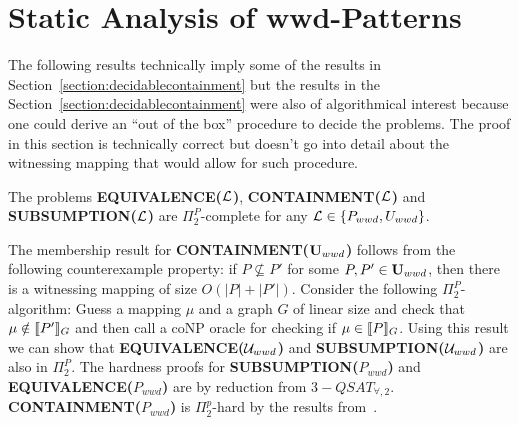 \section{Static Analysis of wwd-Patterns}

The following results technically imply some of the results in
Section~\ref{section:decidablecontainment} but the results in the Section~\ref{section:decidablecontainment}
were also of algorithmical interest because one could derive an ``out of the box''
procedure to decide the problems. The proof in this section is technically
correct but doesn't go into detail about the witnessing mapping that would allow
for such procedure.

\begin{theorem}
	The problems \textbf{EQUIVALENCE($\mathcal{L}$)}, \textbf{CONTAINMENT($\mathcal{L}$)} and
	\textbf{SUBSUMPTION($\mathcal{L}$)} are $\Pi_2^P$-complete 
	for any $\mathcal{L} \in \{ P_{wwd}, U_{wwd} \}$.
\end{theorem}
\begin{proofidea}
	The membership result for \textbf{CONTAINMENT($\mathbf{U}_{wwd}$)} follows from the following
	counterexample property: 
	if $P \not\subseteq P'$ for some $P,P' \in \mathbf{U}_{wwd}$, then
	there is a witnessing mapping of size $O(|P| + |P'|)$.
	Consider the following $\Pi^P_2$-algorithm:
	Guess a mapping $\mu$ and a graph $G$ of linear size and check that $\mu
	\notin \llbracket P' \rrbracket_G$ and then call a coNP oracle for checking if $\mu
	\in \llbracket P \rrbracket_G$.
	Using this result we can show that \textbf{EQUIVALENCE($\mathcal{U}_{wwd}$)}  
	and \textbf{SUBSUMPTION($\mathcal{U}_{wwd}$)} are also in $\Pi^P_2$.
	The hardness proofs for \textbf{SUBSUMPTION($P_{wwd}$)} and\\
	\textbf{EQUIVALENCE($P_{wwd}$)} are by reduction from
	$3-QSAT_{\forall,2}$.\\
	\textbf{CONTAINMENT($P_{wwd}$)} is $\Pi^p_2$-hard by the results from~\cite{pichler2014containment}.
\end{proofidea}
